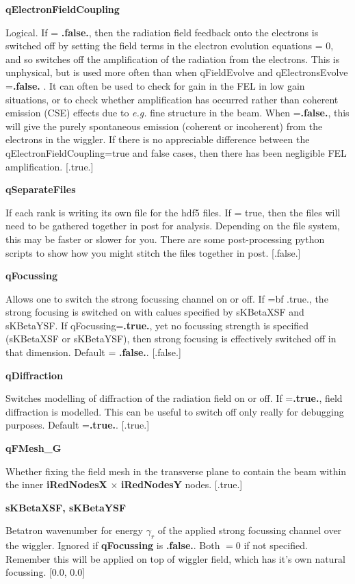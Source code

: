 \documentclass[12pt]{article}%
\begin{document}
{\bf qElectronFieldCoupling}

Logical. If = {\bf .false.}, then the radiation field feedback onto the electrons is switched off by setting the field terms in the electron evolution equations = 0, and so switches off the amplification of the radiation from the electrons. This is unphysical, but is used more often than when qFieldEvolve and qElectronsEvolve ={\bf .false.} . It can often be used to check for gain in the FEL in low gain situations, or to check whether amplification has occurred rather than coherent emission (CSE) effects due to \textit{e.g.} fine structure in the beam. When ={\bf .false.}, this will give the purely spontaneous emission (coherent or incoherent) from the electrons in the wiggler. If there is no appreciable difference between the qElectronFieldCoupling=true and false cases, then there has been negligible FEL amplification. [.true.]

{\bf qSeparateFiles}

If each rank is writing its own file for the hdf5 files. If = true, then the files will need to be gathered together in post for analysis. Depending on the file system, this may be faster or slower for you. There are some post-processing python scripts to show how you might stitch the files together in post. [.false.]

{\bf qFocussing}

Allows one to switch the strong focussing channel on or off. If ={bf .true.}, the strong focusing is switched on with calues specified by sKBetaXSF and sKBetaYSF. If qFocussing={\bf .true.}, yet no focussing strength is specified (sKBetaXSF or sKBetaYSF), then strong focusing is effectively switched off in that dimension. Default = {\bf .false.}. [.false.]

{\bf qDiffraction}

Switches modelling of diffraction of the radiation field on or off. If ={\bf .true.}, field diffraction is modelled. This can be useful to switch off only really for debugging purposes. Default ={\bf .true.}. [.true.]

{\bf qFMesh\_G}

Whether fixing the field mesh in the transverse plane to contain the beam within the inner {\bf iRedNodesX} $\times$ {\bf iRedNodesY} nodes. [.true.]


{\bf sKBetaXSF, sKBetaYSF}

Betatron wavenumber for energy $\gamma_r$ of the applied strong focussing channel over the wiggler. Ignored if {\bf qFocussing} is {\bf .false.}. Both $=0$ if not specified. Remember this will be applied on top of wiggler field, which has it's own natural focussing. [0.0, 0.0]
\end{document}
